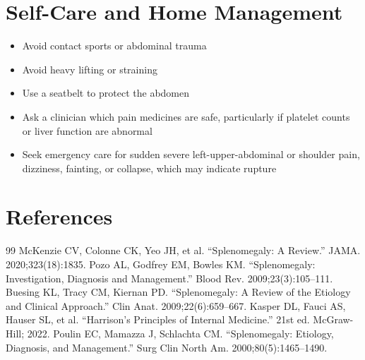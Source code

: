 \section*{Self-Care and Home Management}
\begin{itemize}
\item Avoid contact sports or abdominal trauma
\item Avoid heavy lifting or straining
\item Use a seatbelt to protect the abdomen
\item Ask a clinician which pain medicines are safe, particularly if platelet counts or liver function are abnormal
\item Seek emergency care for sudden severe left-upper-abdominal or shoulder pain, dizziness, fainting, or collapse, which may indicate rupture
\end{itemize}

\section*{References}
\begin{thebibliography}{99}
 McKenzie CV, Colonne CK, Yeo JH, et al. ``Splenomegaly: A Review.'' JAMA. 2020;323(18):1835.
 Pozo AL, Godfrey EM, Bowles KM. ``Splenomegaly: Investigation, Diagnosis and Management.'' Blood Rev. 2009;23(3):105--111.
 Buesing KL, Tracy CM, Kiernan PD. ``Splenomegaly: A Review of the Etiology and Clinical Approach.'' Clin Anat. 2009;22(6):659--667.
 Kasper DL, Fauci AS, Hauser SL, et al. ``Harrison's Principles of Internal Medicine.'' 21st ed. McGraw-Hill; 2022.
 Poulin EC, Mamazza J, Schlachta CM. ``Splenomegaly: Etiology, Diagnosis, and Management.'' Surg Clin North Am. 2000;80(5):1465--1490.
\end{thebibliography}

